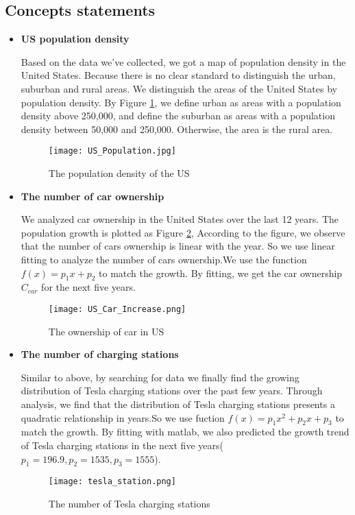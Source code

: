\documentclass[12pt]{article}  %
\begin{document}
\subsection{Concepts statements}
\begin{itemize}
	\item \textbf{US population density}
		
Based on the data we've collected, we got a map of population density in the United States. Because there is no clear standard to distinguish the urban, suburban and rural areas. We distinguish the areas of the United States by population density. By Figure \ref{fig:1}, we define urban as areas with a population density above 250,000, and define the suburban as areas with a population density between 50,000 and 250,000. Otherwise, the area is the rural area.
\begin{figure}[H]
	\centering
	\texttt{[image: US\_Population.jpg]}
	\caption{The population density of the US}\label{fig:1}
\end{figure}	

	\item \textbf{The number of car ownership}
	
We analyzed car ownership in the United States over the last 12 years. The population growth is plotted as Figure \ref{fig:2}, According to the figure, we observe that the number of cars ownership is linear with the year. So we use linear fitting to analyze the number of cars ownership.We use the function
$f(x) = {p_1}x + {p_2}$ to match the growth. By fitting, we get the car ownership ${C_{car}}$ for the next five years.
\begin{figure}[H]
	\centering
	\texttt{[image: US\_Car\_Increase.png]}
	\caption{The ownership of car in US}\label{fig:2}
\end{figure}

	\item \textbf{The number of charging stations}
	
Similar to above, by searching for data we finally find the growing distribution of Tesla charging stations over the past few years. Through analysis, we find that the distribution of Tesla charging stations presents a quadratic relationship in years.So we use fuction $f(x) = {p_1}{x^2} + {p_2}x + {p_3}$ to match the growth. By fitting with matlab, we also predicted the growth trend of Tesla charging stations in the next five years(${p_1=196.9, p_2=1535, p_3=1555}$).
\begin{figure}[H]
	\centering
	\texttt{[image: tesla\_station.png]}
	\caption{The number of Tesla charging stations}\label{fig:3}
\end{figure}

\end{itemize}
\end{document}

